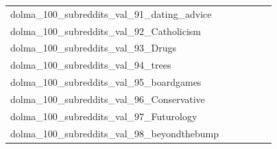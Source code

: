 \documentclass[dvipsnames]{article}
\begin{document}
\begin{appendix}
{\begin{longtable}{m{6cm}m{1.7cm}m{1.7cm}m{1.7cm}m{1.7cm}m{1.7cm}}
	dolma\_100\_subreddits\_val\_91\_dating\_advice  & \colorbox[HTML]{ffffe5}{\makebox[\mywidth][c]{20.18}} & \colorbox[HTML]{a4d98a}{\makebox[\mywidth][c]{19.27}} & \colorbox[HTML]{ffffe5}{\makebox[\mywidth][c]{20.42}} & \colorbox[HTML]{e3f4aa}{\makebox[\mywidth][c]{19.40}} & \colorbox[HTML]{77c578}{\makebox[\mywidth][c]{19.21}}\\
	dolma\_100\_subreddits\_val\_92\_Catholicism  & \colorbox[HTML]{ffffe5}{\makebox[\mywidth][c]{19.11}} & \colorbox[HTML]{dcf1a5}{\makebox[\mywidth][c]{18.22}} & \colorbox[HTML]{ffffe5}{\makebox[\mywidth][c]{19.41}} & \colorbox[HTML]{c8e89a}{\makebox[\mywidth][c]{18.17}} & \colorbox[HTML]{77c578}{\makebox[\mywidth][c]{18.03}}\\
	dolma\_100\_subreddits\_val\_93\_Drugs  & \colorbox[HTML]{ffffe5}{\makebox[\mywidth][c]{24.50}} & \colorbox[HTML]{cdeb9d}{\makebox[\mywidth][c]{23.29}} & \colorbox[HTML]{ffffe5}{\makebox[\mywidth][c]{24.74}} & \colorbox[HTML]{d8efa2}{\makebox[\mywidth][c]{23.32}} & \colorbox[HTML]{77c578}{\makebox[\mywidth][c]{23.12}}\\
	dolma\_100\_subreddits\_val\_94\_trees  & \colorbox[HTML]{ffffe5}{\makebox[\mywidth][c]{23.56}} & \colorbox[HTML]{bde395}{\makebox[\mywidth][c]{22.38}} & \colorbox[HTML]{ffffe5}{\makebox[\mywidth][c]{23.83}} & \colorbox[HTML]{ccea9c}{\makebox[\mywidth][c]{22.41}} & \colorbox[HTML]{77c578}{\makebox[\mywidth][c]{22.25}}\\
	dolma\_100\_subreddits\_val\_95\_boardgames  & \colorbox[HTML]{ffffe5}{\makebox[\mywidth][c]{22.69}} & \colorbox[HTML]{afdd8f}{\makebox[\mywidth][c]{21.48}} & \colorbox[HTML]{ffffe5}{\makebox[\mywidth][c]{23.13}} & \colorbox[HTML]{daf0a4}{\makebox[\mywidth][c]{21.61}} & \colorbox[HTML]{77c578}{\makebox[\mywidth][c]{21.38}}\\
	dolma\_100\_subreddits\_val\_96\_Conservative  & \colorbox[HTML]{ffffe5}{\makebox[\mywidth][c]{22.79}} & \colorbox[HTML]{7dc87b}{\makebox[\mywidth][c]{21.53}} & \colorbox[HTML]{ffffe5}{\makebox[\mywidth][c]{22.97}} & \colorbox[HTML]{cdeb9d}{\makebox[\mywidth][c]{21.68}} & \colorbox[HTML]{77c578}{\makebox[\mywidth][c]{21.53}}\\
	dolma\_100\_subreddits\_val\_97\_Futurology  & \colorbox[HTML]{ffffe5}{\makebox[\mywidth][c]{23.55}} & \colorbox[HTML]{d5eea1}{\makebox[\mywidth][c]{22.36}} & \colorbox[HTML]{ffffe5}{\makebox[\mywidth][c]{23.77}} & \colorbox[HTML]{d8efa2}{\makebox[\mywidth][c]{22.37}} & \colorbox[HTML]{77c578}{\makebox[\mywidth][c]{22.17}}\\
	dolma\_100\_subreddits\_val\_98\_beyondthebump  & \colorbox[HTML]{ffffe5}{\makebox[\mywidth][c]{21.07}} & \colorbox[HTML]{a4d98a}{\makebox[\mywidth][c]{19.89}} & \colorbox[HTML]{ffffe5}{\makebox[\mywidth][c]{21.22}} & \colorbox[HTML]{e9f6af}{\makebox[\mywidth][c]{20.08}} & \colorbox[HTML]{77c578}{\makebox[\mywidth][c]{19.83}}\\

\end{longtable}}
\end{appendix}
\end{document}

